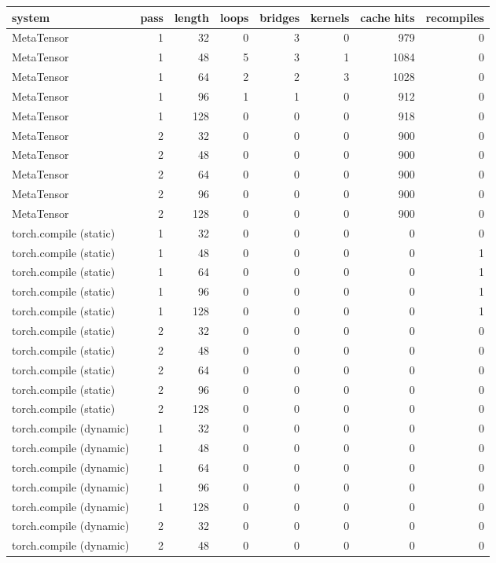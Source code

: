 \begin{tabular}{lrrrrrrr}
\toprule
system & pass & length & loops & bridges & kernels & cache hits & recompiles \\
\midrule
MetaTensor & 1 & 32 & 0 & 3 & 0 & 979 & 0 \\
MetaTensor & 1 & 48 & 5 & 3 & 1 & 1084 & 0 \\
MetaTensor & 1 & 64 & 2 & 2 & 3 & 1028 & 0 \\
MetaTensor & 1 & 96 & 1 & 1 & 0 & 912 & 0 \\
MetaTensor & 1 & 128 & 0 & 0 & 0 & 918 & 0 \\
MetaTensor & 2 & 32 & 0 & 0 & 0 & 900 & 0 \\
MetaTensor & 2 & 48 & 0 & 0 & 0 & 900 & 0 \\
MetaTensor & 2 & 64 & 0 & 0 & 0 & 900 & 0 \\
MetaTensor & 2 & 96 & 0 & 0 & 0 & 900 & 0 \\
MetaTensor & 2 & 128 & 0 & 0 & 0 & 900 & 0 \\
torch.compile (static) & 1 & 32 & 0 & 0 & 0 & 0 & 0 \\
torch.compile (static) & 1 & 48 & 0 & 0 & 0 & 0 & 1 \\
torch.compile (static) & 1 & 64 & 0 & 0 & 0 & 0 & 1 \\
torch.compile (static) & 1 & 96 & 0 & 0 & 0 & 0 & 1 \\
torch.compile (static) & 1 & 128 & 0 & 0 & 0 & 0 & 1 \\
torch.compile (static) & 2 & 32 & 0 & 0 & 0 & 0 & 0 \\
torch.compile (static) & 2 & 48 & 0 & 0 & 0 & 0 & 0 \\
torch.compile (static) & 2 & 64 & 0 & 0 & 0 & 0 & 0 \\
torch.compile (static) & 2 & 96 & 0 & 0 & 0 & 0 & 0 \\
torch.compile (static) & 2 & 128 & 0 & 0 & 0 & 0 & 0 \\
torch.compile (dynamic) & 1 & 32 & 0 & 0 & 0 & 0 & 0 \\
torch.compile (dynamic) & 1 & 48 & 0 & 0 & 0 & 0 & 0 \\
torch.compile (dynamic) & 1 & 64 & 0 & 0 & 0 & 0 & 0 \\
torch.compile (dynamic) & 1 & 96 & 0 & 0 & 0 & 0 & 0 \\
torch.compile (dynamic) & 1 & 128 & 0 & 0 & 0 & 0 & 0 \\
torch.compile (dynamic) & 2 & 32 & 0 & 0 & 0 & 0 & 0 \\
torch.compile (dynamic) & 2 & 48 & 0 & 0 & 0 & 0 & 0 \\

\end{tabular}
